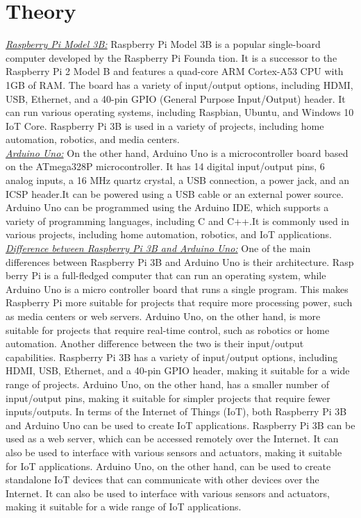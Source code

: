 \documentclass{article}
\begin{document}
\section{\textbf{Theory}}
\textit{\underline{Raspberry Pi Model 3B:}} Raspberry Pi Model 3B is a popular single-board computer developed by the Raspberry Pi Founda
tion. It is a successor to the Raspberry Pi 2 Model B and features a quad-core ARM Cortex-A53 CPU with 1GB of RAM. The board has a variety of input/output options, including HDMI, USB, Ethernet,
and a 40-pin GPIO (General Purpose Input/Output) header. It can run various operating systems, including Raspbian, Ubuntu, and Windows 10 IoT Core. Raspberry Pi 3B is used in a variety of projects, including home automation, robotics, and media centers.\\

\textit{\underline{Arduino Uno:}} On the other hand, Arduino Uno is a microcontroller board based on the ATmega328P microcontroller. It has 14 digital input/output pins, 6 analog inputs, a 16 MHz quartz crystal, a USB connection, a
power jack, and an ICSP header.It can be powered using a USB cable or an external power source. Arduino Uno can be programmed using the Arduino IDE, which supports a variety of programming languages, including C
and C++.It is commonly used in various projects, including home automation, robotics, and IoT applications.\\

\textit{\underline{Difference between Raspberry Pi 3B and Arduino Uno:}}
One of the main differences between Raspberry Pi 3B and Arduino Uno is their architecture. Rasp berry Pi is a full-fledged computer that can run an operating system, while Arduino Uno is a micro controller board that runs a single program.
This makes Raspberry Pi more suitable for projects that require more processing power, such as media centers or web servers. Arduino Uno, on the other hand, is more suitable for projects that require real-time control, such as robotics or home automation.
Another difference between the two is their input/output capabilities. Raspberry Pi 3B has a
variety of input/output options, including HDMI, USB, Ethernet, and a 40-pin GPIO header, making
it suitable for a wide range of projects. Arduino Uno, on the other hand, has a smaller number of input/output pins, making it suitable for simpler projects that require fewer inputs/outputs.
In terms of the Internet of Things (IoT), both Raspberry Pi 3B and Arduino Uno can be used to
create IoT applications. Raspberry Pi 3B can be used as a web server, which can be accessed remotely over the Internet.
It can also be used to interface with various sensors and actuators, making it suitable for IoT applications. Arduino Uno, on the other hand, can be used to create standalone IoT devices that can communicate with other devices over the Internet.
It can also be used to interface with various sensors and actuators, making it suitable for a wide range of IoT applications.
\end{document}
